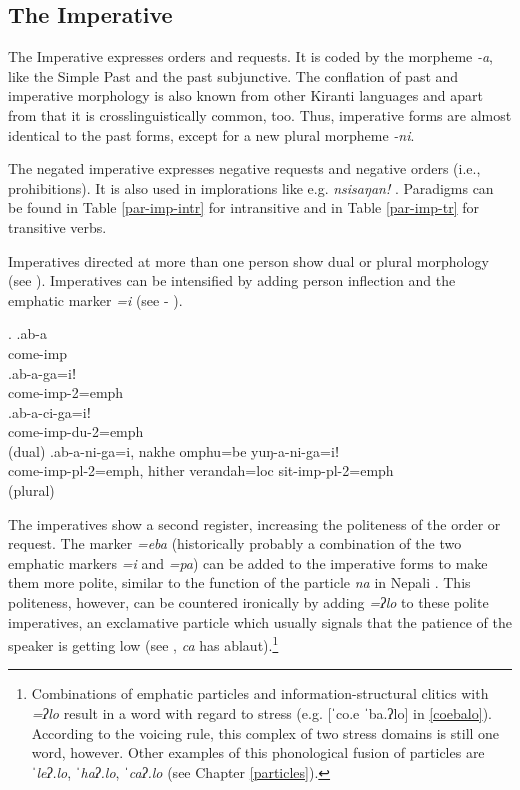 \subsection{The Imperative}

The Imperative expresses orders and requests. It is coded by the morpheme \emph{-a}, like the Simple Past and the past subjunctive. The conflation of past and imperative morphology is also known from other Kiranti languages \citep{Bickel2003Belhare, Ebert2003Camling} and apart from that it is crosslinguistically common, too. Thus, imperative forms are almost identical to the past forms, except for a new plural morpheme \emph{-ni}. 

The negated imperative expresses negative requests and negative orders (i.e., prohibitions). It is also used in implorations like e.g. \emph{nsisaŋan!} . Paradigms can be found in Table \ref{par-imp-intr} for intransitive and in Table \ref{par-imp-tr} for transitive verbs.
 
Imperatives directed at more than one person show dual or plural morphology (see \Next).  Imperatives can be intensified by adding person inflection and the emphatic marker \emph{=i} (see \Next[b] - \Next[d]). 
 
 \ex. \ag.ab-a\\
 come{\sc -imp}\\
 \bg.ab-a-ga=iǃ\\
come{\sc -imp-2=emph}\\
 \bg.ab-a-ci-ga=iǃ\\
come{\sc -imp-du-2=emph}\\
  (dual)
 \bg.ab-a-ni-ga=i, nakhe omphu=be yuŋ-a-ni-ga=iǃ\\
come{\sc -imp-pl-2=emph}, hither verandah{\sc =loc} sit{\sc -imp-pl-2=emph}\\
  (plural)
 
The imperatives show a second register, increasing the  politeness of the order or request. The marker \emph{=eba} (historically probably a combination of the two  emphatic markers  \emph{=i} and \emph{=pa}) can be added to the imperative forms to make them more polite, similar to the function of the  particle \emph{na} in Nepali  \Next. This politeness, however, can be countered ironically by adding \emph{=ʔlo} to these polite imperatives, an exclamative particle which usually signals that  the patience of the speaker is getting low (see \Next[c], \emph{ca} has ablaut).\footnote{Combinations of emphatic particles and information-structural clitics with \emph{=ʔlo} result in a word with regard to stress (e.g. [ˈco.e ˈba.ʔlo] in \ref{coebalo}). According to the voicing rule,  this complex of two stress domains is still one word, however. Other examples of this phonological fusion of particles are \emph{ˈleʔ.lo}, \emph{ˈhaʔ.lo}, \emph{ˈcaʔ.lo} (see Chapter \ref{particles}).}

